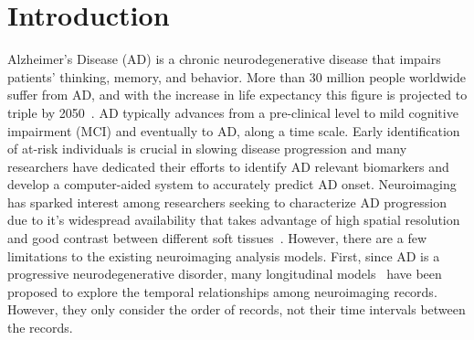 
\fi

\section{Introduction}
Alzheimer's Disease (AD) is a chronic neurodegenerative disease that impairs patients' thinking, memory, and behavior. More than 30 million people worldwide suffer from AD, and with the increase in life expectancy this figure is projected to triple by 2050~\cite{barnes2011projected}. AD typically advances from a pre-clinical level to mild cognitive impairment (MCI) and eventually to AD, along a time scale. Early identification of at-risk individuals is crucial in slowing disease progression and many researchers have dedicated their efforts to identify AD relevant biomarkers and develop a computer-aided system to accurately predict AD onset.
Neuroimaging has sparked interest among researchers seeking to characterize AD progression due to it's widespread availability that takes advantage of high spatial resolution and good contrast between different soft tissues~\cite{stonnington2010predicting,wang2012phenotype,brand2018joint}.
However, there are a few limitations to the existing neuroimaging analysis models. 
First, since AD is a progressive neurodegenerative disorder, many longitudinal models~\cite{brand2018joint,wang2012high,wang2016prediction,wang2017longitudinal} have been proposed to explore the temporal relationships among neuroimaging records. However, they only consider the order of records, not their time intervals between the records.

